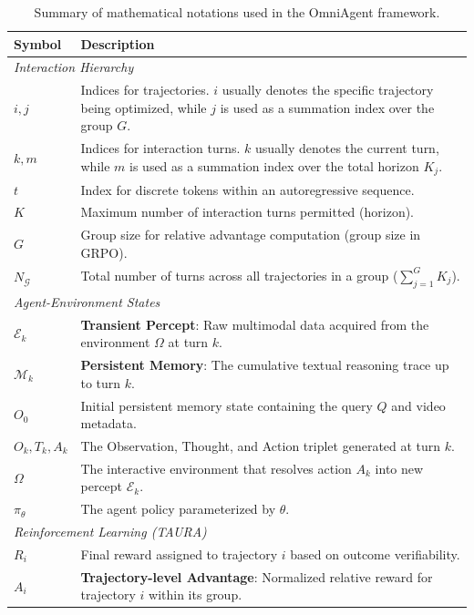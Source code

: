 \documentclass{article}
\theoremstyle{plain}
\theoremstyle{definition}
\theoremstyle{remark}
\begin{document}
\begin{table}[h]
\centering
\caption{Summary of mathematical notations used in the OmniAgent framework.}
\label{tab:notations}
\small
\renewcommand{\arraystretch}{1.2}
\begin{tabularx}{\textwidth}{l X}
\toprule
\textbf{Symbol} & \textbf{Description} \\
\midrule
\multicolumn{2}{l}{\textit{Interaction Hierarchy}} \\
$i, j$ & Indices for trajectories. $i$ usually denotes the specific trajectory being optimized, while $j$ is used as a summation index over the group $G$. \\
$k, m$ & Indices for interaction turns. $k$ usually denotes the current turn, while $m$ is used as a summation index over the total horizon $K_j$. \\
$t$ & Index for discrete tokens within an autoregressive sequence. \\
$K$ & Maximum number of interaction turns permitted (horizon). \\
$G$ & Group size for relative advantage computation (group size in GRPO). \\
$N_{\mathcal{G}}$ & Total number of turns across all trajectories in a group ($\sum_{j=1}^{G} K_j$). \\
\midrule
\multicolumn{2}{l}{\textit{Agent-Environment States}} \\
$\mathcal{E}_k$ & \textbf{Transient Percept}: Raw multimodal data acquired from the environment $\Omega$ at turn $k$. \\
$\mathcal{M}_k$ & \textbf{Persistent Memory}: The cumulative textual reasoning trace up to turn $k$. \\
$O_0$ & Initial persistent memory state containing the query $Q$ and video metadata. \\
$O_k, T_k, A_k$ & The Observation, Thought, and Action triplet generated at turn $k$. \\
$\Omega$ & The interactive environment that resolves action $A_k$ into new percept $\mathcal{E}_k$. \\
$\pi_\theta$ & The agent policy parameterized by $\theta$. \\
\midrule
\multicolumn{2}{l}{\textit{Reinforcement Learning (TAURA)}} \\
$R_i$ & Final reward assigned to trajectory $i$ based on outcome verifiability. \\
$A_i$ & \textbf{Trajectory-level Advantage}: Normalized relative reward for trajectory $i$ within its group. \\

\end{tabularx}
\end{table}
\end{document}
